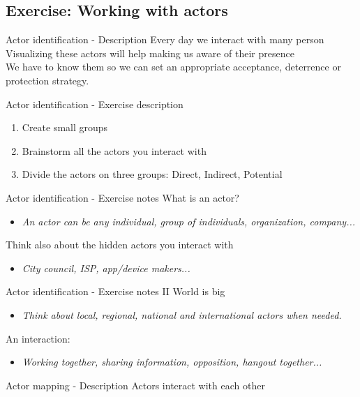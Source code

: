 \documentclass[11pt]{beamer}
\begin{document}
\subsection{Exercise: Working with actors}
\begin{frame}{Actor identification - Description}
Every day  we interact with many  person\\
Visualizing these actors will help making us aware  of their presence\\
We have to know them  so we  can set an appropriate acceptance, deterrence or protection strategy.\\
\end{frame}
\begin{frame}{Actor identification - Exercise description}
\begin{enumerate}
\item Create small groups
\item Brainstorm all the actors you interact with
\item Divide the actors on three groups: Direct, Indirect, Potential
\end{enumerate}
\end{frame}
\begin{frame}{Actor identification - Exercise notes}
What is an actor?
\begin{itemize}
\item \emph{An actor can be any individual, group of individuals, organization, company...}
\end{itemize}
Think also about the hidden actors you interact with
\begin{itemize}
\item\emph{City council, ISP, app/device makers...}
\end{itemize}
\end{frame}
\begin{frame}{Actor identification - Exercise notes II}
World is big
\begin{itemize}
\item\emph{Think about local, regional, national and international  actors when needed.}\end{itemize}
An interaction:
\begin{itemize}
\item\emph{Working together, sharing information, opposition, hangout together...}
\end{itemize}
\end{frame}
\begin{frame}{Actor mapping - Description}
Actors interact with each other
\end{frame}
\end{document}
